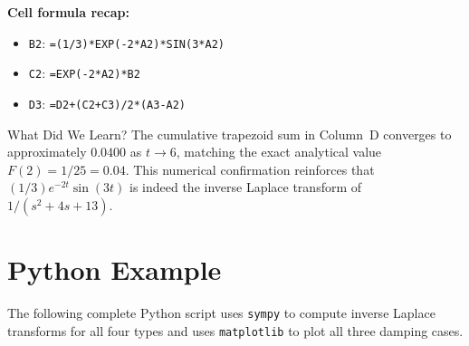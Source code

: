 \documentclass[12pt,a4paper]{article}
\begin{document}
\textbf{Cell formula recap:}
\begin{itemize}[leftmargin=*]
  \item \texttt{B2}: \texttt{=(1/3)*EXP(-2*A2)*SIN(3*A2)}
  \item \texttt{C2}: \texttt{=EXP(-2*A2)*B2}
  \item \texttt{D3}: \texttt{=D2+(C2+C3)/2*(A3-A2)}
\end{itemize}

\begin{learnbox}{What Did We Learn?}
The cumulative trapezoid sum in Column~D converges to approximately $0.0400$ as $t \to 6$,
matching the exact analytical value $F(2) = 1/25 = 0.04$. This numerical confirmation
reinforces that $(1/3)e^{-2t}\sin(3t)$ is indeed the inverse Laplace transform of
$1/(s^2+4s+13)$.
\end{learnbox}

\section{Python Example }

The following complete Python script uses \texttt{sympy} to compute inverse Laplace
transforms for all four types and uses \texttt{matplotlib} to plot all three damping
cases.
\end{document}
